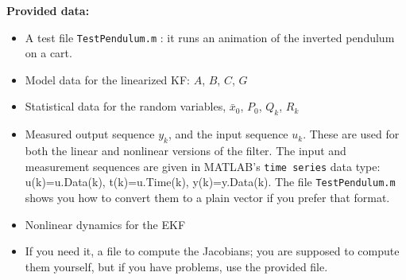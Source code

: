 \documentclass[letterpaper]{article}
\begin{document}
\vspace*{2cm}
\noindent \textbf{Provided data:}
\begin{itemize}
\item A test file \texttt{TestPendulum.m} : it runs an animation of the inverted pendulum on a cart.
\item Model data for the linearized KF: $A$, $B$, $C$, $G$
\item Statistical data for the random variables, $\bar{x}_0$, $P_0$, $Q_k$, $R_k$
    \item Measured output sequence $y_k$, and the input sequence $u_k$. These are used for both the linear and nonlinear versions of the filter. The input and measurement sequences are given in MATLAB's \texttt{time series} data type: u(k)=u.Data(k), t(k)=u.Time(k), y(k)=y.Data(k). The file \texttt{TestPendulum.m} shows you how to convert them to a plain vector if you prefer that format.
    \item Nonlinear dynamics for the EKF
    \item If you need it, a file to compute the Jacobians; you are supposed to compute them yourself, but if you have problems, use the provided file.
\end{itemize}

\newpage
\end{document}
